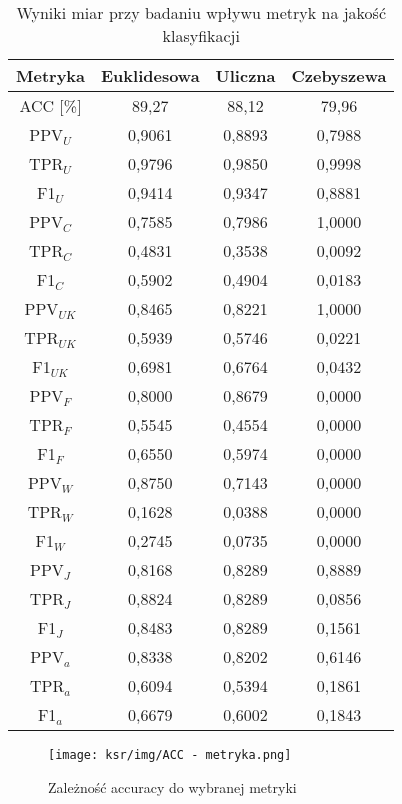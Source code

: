 \documentclass{article}
\begin{document}
\begin{table}[H]
    \centering
    \begin{tabular}{|c|c|c|c|}
    \hline
    \textbf{Metryka} & \textbf{Euklidesowa} & \textbf{Uliczna} & \textbf{Czebyszewa}  \\ \hline
    ACC [\%] & 89,27 & 88,12 & 79,96\\ \hline
    PPV\(_U\) & 0,9061 & 0,8893 & 0,7988\\ \hline
    TPR\(_U\) & 0,9796& 0,9850 & 0,9998\\ \hline
    F1\(_U\)  & 0,9414& 0,9347 & 0,8881\\ \hline
    PPV\(_C\) & 0,7585& 0,7986 & 1,0000\\ \hline
    TPR\(_C\) &  0,4831& 0,3538 & 0,0092\\ \hline
    F1\(_C\) & 0,5902& 0,4904 & 0,0183\\ \hline
    PPV\(_{UK}\) & 0,8465& 0,8221 & 1,0000\\ \hline
    TPR\(_{UK}\) & 0,5939& 0,5746 & 0,0221\\ \hline
    F1\(_{UK}\) & 0,6981& 0,6764 & 0,0432\\ \hline
    PPV\(_F\) & 0,8000& 0,8679 & 0,0000\\ \hline
    TPR\(_F\) & 0,5545& 0,4554 & 0,0000\\ \hline
    F1\(_F\) & 0,6550& 0,5974 & 0,0000\\ \hline
    PPV\(_W\) & 0,8750& 0,7143 & 0,0000\\ \hline
    TPR\(_W\) & 0,1628& 0,0388 & 0,0000\\ \hline
    F1\(_W\) & 0,2745& 0,0735 & 0,0000\\ \hline
    PPV\(_J\) & 0,8168& 0,8289 & 0,8889\\ \hline
    TPR\(_J\) & 0,8824& 0,8289 & 0,0856\\ \hline
    F1\(_J\) & 0,8483 & 0,8289 & 0,1561\\ \hline
    PPV\(_a\) & 0,8338 & 0,8202 & 0,6146\\ \hline
    TPR\(_a\) &  0,6094 & 0,5394 & 0,1861\\ \hline
    F1\(_a\) & 0,6679 & 0,6002 & 0,1843\\ \hline
    \end{tabular}
    \caption{Wyniki miar przy badaniu wpływu metryk na jakość klasyfikacji}
\end{table}
\begin{figure}[H]
    \centering
    \texttt{[image: ksr/img/ACC - metryka.png]}
    \caption{Zależność accuracy do wybranej metryki}
    \label{fig:moj-obraz}
\end{figure}
\end{document}
